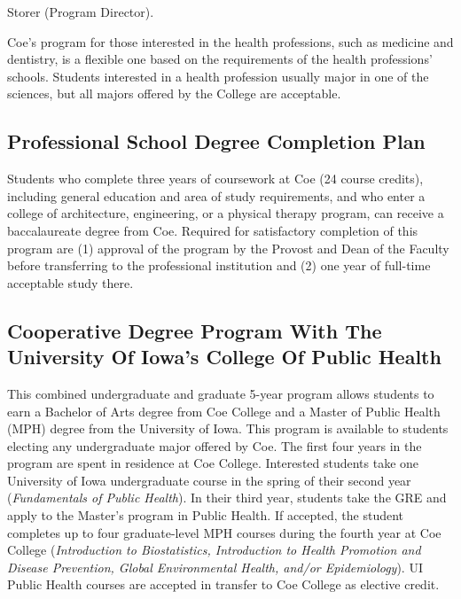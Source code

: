 \documentclass[
  letterpaper,
]{scrbook}
\begin{document}
Storer (Program Director).

Coe's program for those interested in the health professions, such as
medicine and dentistry, is a flexible one based on the requirements of
the health professions' schools. Students interested in a health
profession usually major in one of the sciences, but all majors offered
by the College are acceptable.

\subsection{Professional School Degree Completion
Plan}\label{professional-school-degree-completion-plan}

Students who complete three years of coursework at Coe (24 course
credits), including general education and area of study requirements,
and who enter a college of architecture, engineering, or a physical
therapy program, can receive a baccalaureate degree from Coe. Required
for satisfactory completion of this program are (1) approval of the
program by the Provost and Dean of the Faculty before transferring to
the professional institution and (2) one year of full-time acceptable
study there.

\subsection{Cooperative Degree Program With The University Of Iowa's
College Of Public
Health}\label{cooperative-degree-program-with-the-university-of-iowas-college-of-public-health}

This combined undergraduate and graduate 5-year program allows students
to earn a Bachelor of Arts degree from Coe College and a Master of
Public Health (MPH) degree from the University of Iowa. This program is
available to students electing any undergraduate major offered by Coe.
The first four years in the program are spent in residence at Coe
College. Interested students take one University of Iowa undergraduate
course in the spring of their second year (\emph{Fundamentals of Public
Health}). In their third year, students take the GRE and apply to the
Master's program in Public Health. If accepted, the student completes up
to four graduate-level MPH courses during the fourth year at Coe College
(\emph{Introduction to Biostatistics, Introduction to Health Promotion
and Disease Prevention, Global Environmental Health, and/or
Epidemiology}). UI Public Health courses are accepted in transfer to Coe
College as elective credit.
\end{document}
